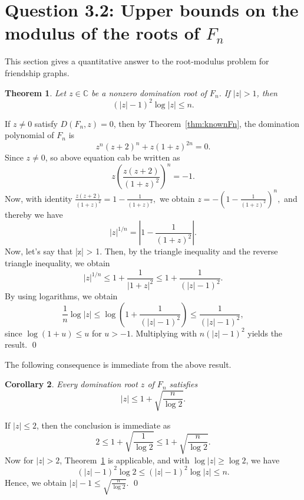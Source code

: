 \documentclass[12pt]{article}
\newtheorem{theorem}{Theorem}[section]
\newtheorem{corollary}[theorem]{Corollary}
\theoremstyle{definition}
\renewenvironment{proof}{{\noindent\bfseries Proof.}}{\qed}
\begin{document}
	\section{Question 3.2: Upper bounds on the modulus of the roots of $F_n$}\label{section 4}
	
	This section gives a quantitative answer to the root-modulus problem for friendship graphs.
	
	\begin{theorem}
		\label{thm:implicitbound}
		Let $z\in \mathbb{C}$ be a nonzero domination root of $F_n$. If $|z|>1$, then
		$$
		(|z|-1)^2\log |z| \le n.
		$$
	\end{theorem}
	
	\begin{proof}
		If $z\neq 0$ satisfy $D(F_n,z)=0$, then by Theorem~\ref{thm:knownFn}, the domination polynomial of $F_n$ is
		$$
		z^n(z+2)^n+z(1+z)^{2n}=0.
		$$
		Since $z\neq 0$, so above equation cab be written as
		$$
		z\left(\frac{z(z+2)}{(1+z)^2}\right)^n=-1.
		$$
		Now, with  identity $\frac{z(z+2)}{(1+z)^2}=1-\frac{1}{(1+z)^2},$ we obtain
		$
		z=-\left(1-\frac{1}{(1+z)^2}\right)^n,
		$
		and thereby we have
		$$
		|z|^{1/n}=\left|1-\frac{1}{(1+z)^2}\right|.
		$$
		Now, let's say that |z| > 1. Then, by the triangle inequality and the reverse triangle inequality, we obtain
		$$
		|z|^{1/n}\le 1+\frac{1}{|1+z|^2}\le 1+\frac{1}{(|z|-1)^2}.
		$$
		By using logarithms, we obtain
		$$
		\frac{1}{n}\log |z|
		\le
		\log\left(1+\frac{1}{(|z|-1)^2}\right)
		\le
		\frac{1}{(|z|-1)^2},
		$$
		since $\log(1+u)\le u$ for $u>-1$. Multiplying with $n(|z|-1)^2$ yields the result.
	\end{proof}
	
	
	
	
	
	The following consequence is immediate from the above result.
	\begin{corollary}
		\label{cor:explicitbound}
		Every domination root $z$ of $F_n$ satisfies
		$$
		|z|\le 1+\sqrt{\frac{n}{\log 2}}.
		$$
	\end{corollary}
	
	\begin{proof}
		If $|z|\le 2$, then the conclusion is immediate as
		$$
		2 \le 1+\sqrt{\frac{1}{\log 2}} \le 1+\sqrt{\frac{n}{\log 2}}.
		$$
		Now for $|z|>2$, Theorem~\ref{thm:implicitbound} is applicable, and with $\log |z|\ge \log 2$, we have
		$$
		(|z|-1)^2\log 2 \le (|z|-1)^2\log |z| \le n.
		$$
		Hence, we obtain $|z|-1 \le \sqrt{\frac{n}{\log 2}}.$
	\end{proof}
	
\end{document}
